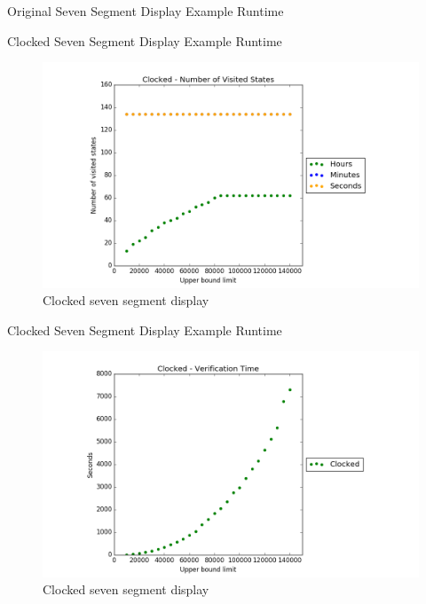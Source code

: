 \documentclass[11pt]{beamer}
\begin{document}
\begin{frame}{Original Seven Segment Display Example Runtime}
\end{frame}

\begin{frame}{Clocked Seven Segment Display Example Runtime}
          \begin{figure}[!ht]
               \centering
               \includegraphics[scale=0.4]{figures/clocked_states.png}
               \caption{Clocked seven segment display}
          \end{figure}
\end{frame}

\begin{frame}{Clocked Seven Segment Display Example Runtime}
          \begin{figure}[!ht]
               \centering
               \includegraphics[scale=0.4]{figures/clocked_verification_time.png}
               \caption{Clocked seven segment display}
          \end{figure}
\end{frame}
\end{document}
